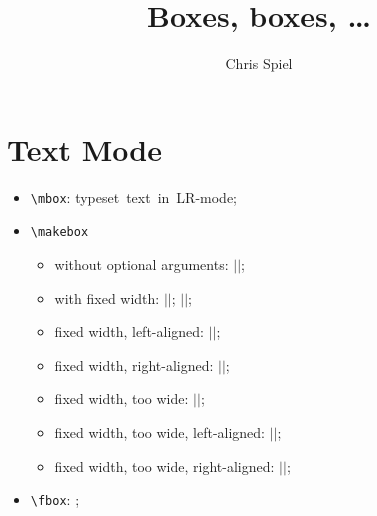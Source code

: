 \documentclass{article}
\title{Boxes, boxes, \dots}
\author{Chris Spiel}
\date{}
\newenvironment{markerbar}{\begingroup$|$}{$|$\endgroup}
\begin{document}
\maketitle

\section{Text Mode}

\begin{itemize}
\item \texttt{\textbackslash mbox}:
  \mbox{typeset text in LR-mode};

\item \texttt{\textbackslash makebox}
  \begin{itemize}
  \item without optional arguments:
    \begin{markerbar}\end{markerbar};
  \item with fixed width:
    \begin{markerbar}\end{markerbar};
    \begin{markerbar}\end{markerbar};
  \item fixed width, left-aligned:
    \begin{markerbar}\end{markerbar};
  \item fixed width, right-aligned:
    \begin{markerbar}\end{markerbar};
  \item fixed width, too wide:
    \begin{markerbar}\end{markerbar};
  \item fixed width, too wide, left-aligned:
    \begin{markerbar}\end{markerbar};
  \item fixed width, too wide, right-aligned:
    \begin{markerbar}\end{markerbar};
  \end{itemize}

\item \texttt{\textbackslash fbox}:
  ;


\end{itemize}
\end{document}

